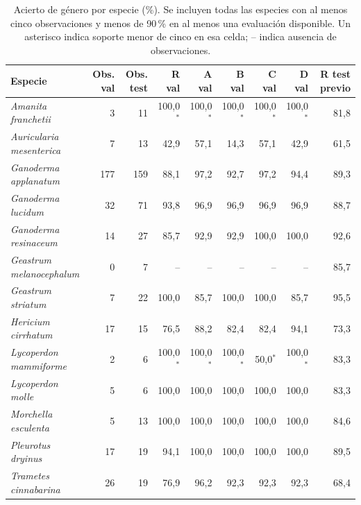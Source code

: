 \begin{table}[H]
\centering
\footnotesize
\caption{Acierto de género por especie (\%). Se incluyen todas las especies con al menos cinco observaciones y menos de 90\,\% en al menos una evaluación disponible. Un asterisco indica soporte menor de cinco en esa celda; -- indica ausencia de observaciones.}
\label{tab:species}
\begin{tabularx}{\linewidth}{Y r r r r r r r r}
\toprule
\textbf{Especie} & \textbf{Obs. val} & \textbf{Obs. test} & \textbf{R val} & \textbf{A val} & \textbf{B val} & \textbf{C val} & \textbf{D val} & \textbf{R test previo}\\
\midrule
\textit{Amanita franchetii} & 3 & 11 & 100,0$^{*}$ & 100,0$^{*}$ & 100,0$^{*}$ & 100,0$^{*}$ & 100,0$^{*}$ & 81,8\\
\textit{Auricularia mesenterica} & 7 & 13 & 42,9 & 57,1 & 14,3 & 57,1 & 42,9 & 61,5\\
\textit{Ganoderma applanatum} & 177 & 159 & 88,1 & 97,2 & 92,7 & 97,2 & 94,4 & 89,3\\
\textit{Ganoderma lucidum} & 32 & 71 & 93,8 & 96,9 & 96,9 & 96,9 & 96,9 & 88,7\\
\textit{Ganoderma resinaceum} & 14 & 27 & 85,7 & 92,9 & 92,9 & 100,0 & 100,0 & 92,6\\
\textit{Geastrum melanocephalum} & 0 & 7 & -- & -- & -- & -- & -- & 85,7\\
\textit{Geastrum striatum} & 7 & 22 & 100,0 & 85,7 & 100,0 & 100,0 & 85,7 & 95,5\\
\textit{Hericium cirrhatum} & 17 & 15 & 76,5 & 88,2 & 82,4 & 82,4 & 94,1 & 73,3\\
\textit{Lycoperdon mammiforme} & 2 & 6 & 100,0$^{*}$ & 100,0$^{*}$ & 100,0$^{*}$ & 50,0$^{*}$ & 100,0$^{*}$ & 83,3\\
\textit{Lycoperdon molle} & 5 & 6 & 100,0 & 100,0 & 100,0 & 100,0 & 100,0 & 83,3\\
\textit{Morchella esculenta} & 5 & 13 & 100,0 & 100,0 & 100,0 & 100,0 & 100,0 & 84,6\\
\textit{Pleurotus dryinus} & 17 & 19 & 94,1 & 100,0 & 100,0 & 100,0 & 100,0 & 89,5\\
\textit{Trametes cinnabarina} & 26 & 19 & 76,9 & 96,2 & 92,3 & 92,3 & 92,3 & 68,4\\
\bottomrule
\end{tabularx}
\end{table}
